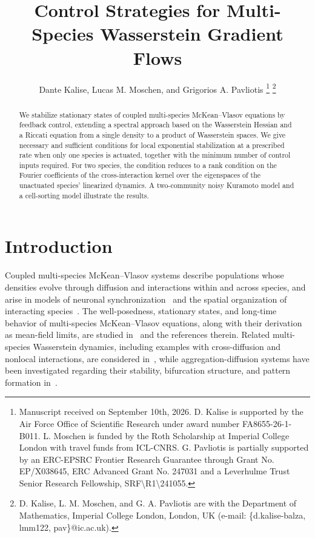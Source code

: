 \documentclass[letterpaper, 10pt, conference]{ieeeconf}
\begin{document}
\title{\LARGE \bf Control Strategies for Multi-Species Wasserstein Gradient Flows}

\author{Dante Kalise,
        Lucas M. Moschen,
        and Grigorios A. Pavliotis
\thanks{Manuscript received on September 10th, 2026.
D. Kalise is supported by the Air Force Office of Scientific Research under award number FA8655-26-1-B011.
L. Moschen is funded by the Roth Scholarship at Imperial College London with travel funds from ICL-CNRS.
G. Pavliotis is partially supported by an ERC-EPSRC Frontier Research Guarantee through Grant No. EP/X038645, ERC Advanced Grant No. 247031 and a Leverhulme Trust Senior Research Fellowship, SRF\textbackslash{}R1\textbackslash{}241055.}%
\thanks{D. Kalise, L. M. Moschen, and G. A. Pavliotis are with the Department of Mathematics, Imperial College London, London, UK (e-mail: \{d.kalise-balza, lmm122, pav\}@ic.ac.uk).}%
}

\maketitle
\thispagestyle{empty}

\begin{abstract}
    We stabilize stationary states of coupled multi-species McKean--Vlasov equations by feedback control, extending a spectral approach based on the Wasserstein Hessian and a Riccati equation from a single density to a product of Wasserstein spaces.
    We give necessary and sufficient conditions for local exponential stabilization at a prescribed rate when only one species is actuated, together with the minimum number of control inputs required.
    For two species, the condition reduces to a rank condition on the Fourier coefficients of the cross-interaction kernel over the eigenspaces of the unactuated species' linearized dynamics.
    A two-community noisy Kuramoto model and a cell-sorting model illustrate the results.
\end{abstract}

\section{Introduction}
\label{sec:introduction}

Coupled multi-species McKean--Vlasov systems describe populations whose densities evolve through diffusion and interactions within and across species, and arise in models of neuronal synchronization~\cite{rohling2020two, Meylahn2020} and the spatial organization of interacting species~\cite{GiuntaHillenLewisPotts2024, CarrilloSalmaniw2025}.
The well-posedness, stationary states, and long-time behavior of multi-species McKean--Vlasov equations, along with their derivation as mean-field limits, are studied in~\cite{duong2025multi} and the references therein.
Related multi-species Wasserstein dynamics, including examples with cross-diffusion and nonlocal interactions, are considered in~\cite{CongerHoffmanMazumdarRatliff2025}, while aggregation-diffusion systems have been investigated regarding their stability, bifurcation structure, and pattern formation in~\cite{GiuntaHillenLewisPotts2024, CarrilloSalmaniw2025}.
\end{document}
